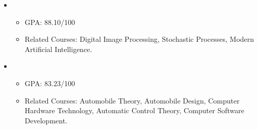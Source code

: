   \begin{itemize}[leftmargin=*]
    \item
      {\small
      \begin{itemize}
         \item{GPA: 88.10/100}
         \item{Related Courses: Digital Image Processing, Stochastic Processes, Modern Artificial Intelligence.}
      \end{itemize}
      }
    \item
      {\small
      \begin{itemize}
         \item{GPA: 83.23/100}
	     \item{Related Courses: Automobile Theory, Automobile Design, Computer Hardware Technology, Automatic Control Theory, Computer Software Development.}
      \end{itemize}
      }
  \end{itemize}
